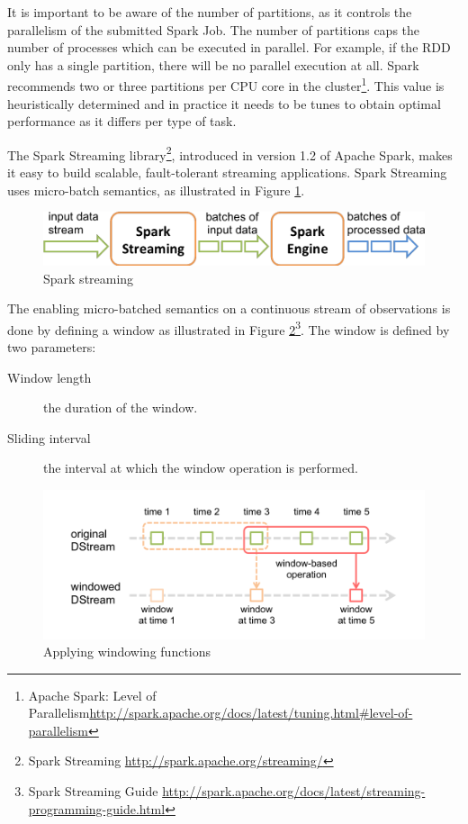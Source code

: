 It is important to be aware of the number of partitions, as it controls the parallelism of the submitted Spark Job. The number of partitions caps the number of processes which can be executed in parallel. For example, if the RDD only has a single partition, there will be no parallel execution at all. Spark recommends two or three partitions per CPU core in the cluster\footnote{Apache Spark: Level of Parallelism\url{http://spark.apache.org/docs/latest/tuning.html\#level-of-parallelism}}. This value is heuristically determined and in practice it needs to be tunes to obtain optimal performance as it differs per type of task.

The Spark Streaming library\footnote{Spark Streaming \url{http://spark.apache.org/streaming/}}, introduced in version 1.2 of Apache Spark, makes it easy to build scalable, fault-tolerant streaming applications. Spark Streaming uses micro-batch semantics, as illustrated in Figure \ref{fig:streaming}.

\begin{figure}[ht!]
\centering
\includegraphics[width=.9\textwidth]{figures/flow.png}
\caption{Spark streaming \label{fig:streaming}}
\end{figure}

The enabling micro-batched semantics on a continuous stream of observations is done by defining a window as illustrated in Figure \ref{fig:streamingWindow}\footnote{Spark Streaming Guide \url{http://spark.apache.org/docs/latest/streaming-programming-guide.html}}. The window is defined by two parameters:
\begin{description}
  \item[Window length] the duration of the window.
  \item[Sliding interval] the interval at which the window operation is performed.
\end{description}

\begin{figure}[ht!]
\centering
\includegraphics[width=.9\textwidth]{figures/window.png}
\caption{Applying windowing functions \label{fig:streamingWindow}}
\end{figure}

